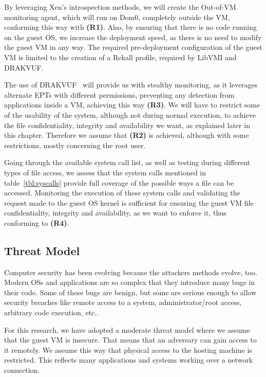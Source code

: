 By leveraging Xen's introspection methods, we will create the Out-of-VM monitoring agent, which will run on Dom0, completely outside the \ac{VM}, conforming this way with \textbf{(R1)}. Also, by ensuring that there is no code running on the guest \ac{OS}, we increase the deployment speed, as there is no need to modify the guest \ac{VM} in any way. The required pre-deployment configuration of the guest \ac{VM} is limited to the creation of a Rekall profile, required by LibVMI and DRAKVUF. 
\par The use of DRAKVUF~\cite{lengyel2014drakvuf} will provide us with stealthy monitoring, as it leverages alternate \ac{EPT}s with different permissions, preventing any detection from applications inside a \ac{VM}, achieving this way \textbf{(R3)}. We will have to restrict some of the usability of the system, although not during normal execution, to achieve the file confidentiality, integrity and availability we want, as explained later in this chapter. Therefore we assume that \textbf{(R2)} is achieved, although with some restrictions, mostly concerning the root user.
\par Going through the available system call list, as well as testing during different types of file access, we assess that the system calls mentioned in table~\ref{tbl:syscalls} provide full coverage of the possible ways a file can be accessed. Monitoring the execution of these system calls and validating the request made to the guest \ac{OS} kernel is sufficient for ensuring the guest \ac{VM} file confidentiality, integrity and availability, as we want to enforce it, thus conforming to \textbf{(R4)}.


\subsection{Threat Model}\label{sub:threat}

Computer security has been evolving because the attackers methods evolve, too. Modern \ac{OS}s and applications are so complex that they introduce many bugs in their code. Some of these bugs are benign, but some are serious enough to allow security breaches like remote access to a system, administrator/root access, arbitrary code execution, etc..

\par For this research, we have adopted a moderate threat model where we assume that the guest \ac{VM} is insecure. That means that an adversary can gain access to it remotely. We assume this way that physical access to the hosting machine is restricted. This reflects many applications and systems working over a network connection.

